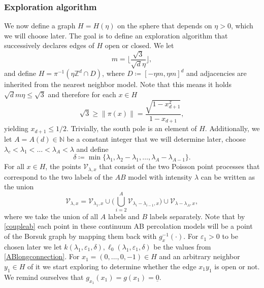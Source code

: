 \documentclass[11pt]{article}%
\newcommand{\norm}[1]{\ensuremath{\left\|#1\right\|}}
\newcommand{\eps}{\varepsilon}
\newcommand{\NN}{\mathbb{N}}
\newcommand{\typ}{\underline{0}}
\begin{document}
\subsubsection{Exploration algorithm}
We now define a graph $H=H(\eta)$ on the sphere that depends on $ \eta>0 $, which we will choose later. The goal is to define an exploration algorithm that successively declares edges of $H$ open or closed. We let 
\begin{equation*}
    m=\bigg\lfloor{\frac{\sqrt{3}}{\sqrt{d}\eta}}\bigg\rfloor,
\end{equation*}
and define $H=\pi^{-1}(\eta\mathbb{Z}^d\cap D)$, where $D\coloneqq [-\eta m, \eta m]^d$ and adjacencies are inherited from the nearest neighbor model. Note that this means it holds $\sqrt{d} m \eta\leq \sqrt{3}$ and therefore for each $x\in H$
\begin{equation}\label{latticecap}
    \sqrt{3}\geq \norm{\pi(x)}=\frac{\sqrt{1-x^2_{d+1}}}{1-x_{d+1}},
\end{equation}
yielding $x_{d+1}\leq 1/2$. Trivially, the south pole is an element of $H$. Additionally, we let $ A=A(d)\in \NN $ be a constant integer that we will determine later, choose $ \lambda_{c}<\lambda_1<\dots<\lambda_{A}<\lambda  $ and define
\begin{equation*}
	\delta\coloneqq\min\bigg\{\lambda_1,\lambda_2-\lambda_1,\dots,\lambda_{A}-\lambda_{A-1}\bigg\}.
\end{equation*}
For all $ x\in H $, the points $ \mathcal{V}_{\lambda,x} $ that consist of the two Poisson point processes that correspond to the two labels of the $ AB $ model with intensity $ \lambda$ can be written as the union
\begin{equation*}
	\mathcal{V}_{\lambda,x}=\mathcal{V}_{\lambda_1,x}\cup\bigg(\bigcup_{i=2}^A \mathcal{V}_{\lambda_{i}-\lambda_{i-1},x}\bigg)\cup \mathcal{V}_{\lambda-\lambda_{A},x},
\end{equation*}
where we take the union of all $ A $ labels and $ B $ labels separately. Note that by \cref{coupleab} each point in these continuum AB percolation models will be a point of the Borsuk graph by mapping them back with $ g^{-1}_x(\cdot) $.
For $ \eps_1>0 $ to be chosen later we let $ k(\lambda_1,\eps_1,\delta),\ell_0(\lambda_1,\eps_1,\delta) $ be the values from \cref{ABlongconnection}. For $ x_1=(0,\dots,0,-1)\in H $ and an arbitrary neighbor $ y_1\in H $ of it we start exploring to determine whether the edge $ x_1 y_1 $ is open or not. We remind ourselves that $ g_{x_1}(x_1)=g(x_1)=\typ $. 
\end{document}
